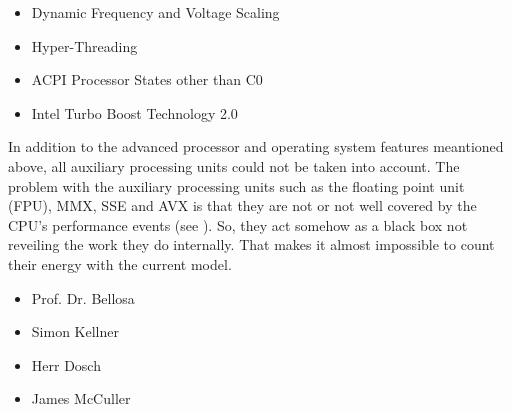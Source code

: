 \begin{itemize}

\item Dynamic Frequency and Voltage Scaling \cite{wiki:DVFS}

\item Hyper-Threading \cite{wiki:HT}

\item ACPI Processor States other than C0 \cite{wiki:ACPI}

\item Intel\TReg{} Turbo Boost Technology 2.0 \cite{wiki:IntelTurboBoost}

\end{itemize}

In addition to the advanced processor and operating system features meantioned
above, all auxiliary processing units could not be taken into account. The
problem with the auxiliary processing units such as the floating point unit
(FPU), MMX\cite{wiki:MMX}, SSE\cite{wiki:SSE} and AVX\cite{wiki:AVX} is that
they are not or not well covered by the CPU's performance events (see
\cite{intel2011events}). So, they act somehow as a black box not reveiling the
work they do internally. That makes it almost impossible to count their
energy with the current model.


\begin{itemize}

\item Prof. Dr. Bellosa

\item Simon Kellner

\item Herr Dosch

\item James McCuller

\end{itemize}

